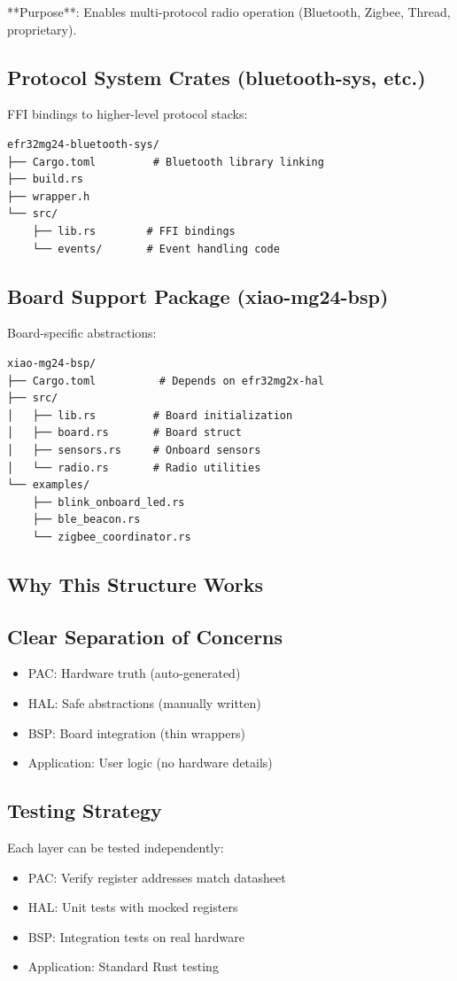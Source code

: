 **Purpose**: Enables multi-protocol radio operation (Bluetooth, Zigbee, Thread, proprietary).

\subsection{Protocol System Crates (bluetooth-sys, etc.)}

FFI bindings to higher-level protocol stacks:

\begin{verbatim}
efr32mg24-bluetooth-sys/
├── Cargo.toml         # Bluetooth library linking
├── build.rs
├── wrapper.h
└── src/
    ├── lib.rs        # FFI bindings
    └── events/       # Event handling code
\end{verbatim}

\subsection{Board Support Package (xiao-mg24-bsp)}

Board-specific abstractions:

\begin{verbatim}
xiao-mg24-bsp/
├── Cargo.toml          # Depends on efr32mg2x-hal
├── src/
│   ├── lib.rs         # Board initialization
│   ├── board.rs       # Board struct
│   ├── sensors.rs     # Onboard sensors
│   └── radio.rs       # Radio utilities
└── examples/
    ├── blink_onboard_led.rs
    ├── ble_beacon.rs
    └── zigbee_coordinator.rs
\end{verbatim}

\subsection{Why This Structure Works}

\subsection{Clear Separation of Concerns}
\begin{itemize}
    \item PAC: Hardware truth (auto-generated)
    \item HAL: Safe abstractions (manually written)
    \item BSP: Board integration (thin wrappers)
    \item Application: User logic (no hardware details)
\end{itemize}

\subsection{Testing Strategy}
Each layer can be tested independently:
\begin{itemize}
    \item PAC: Verify register addresses match datasheet
    \item HAL: Unit tests with mocked registers
    \item BSP: Integration tests on real hardware
    \item Application: Standard Rust testing
\end{itemize}

